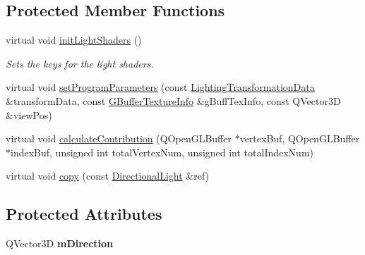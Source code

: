 \subsection*{Protected Member Functions}
\begin{DoxyCompactItemize}
\item 
\mbox{\label{class_geometry_engine_1_1_geometry_world_item_1_1_geometry_light_1_1_directional_light_a0488db9f38fe4382ed9e1b73a4b4eff7}} 
virtual void \mbox{\hyperlink{class_geometry_engine_1_1_geometry_world_item_1_1_geometry_light_1_1_directional_light_a0488db9f38fe4382ed9e1b73a4b4eff7}{init\+Light\+Shaders}} ()
\begin{DoxyCompactList}\small\item\em Sets the keys for the light shaders. \end{DoxyCompactList}\item 
virtual void \mbox{\hyperlink{class_geometry_engine_1_1_geometry_world_item_1_1_geometry_light_1_1_directional_light_ae395d609ee47dd5d399514bb2c76d2db}{set\+Program\+Parameters}} (const \mbox{\hyperlink{class_geometry_engine_1_1_lighting_transformation_data}{Lighting\+Transformation\+Data}} \&transform\+Data, const \mbox{\hyperlink{class_geometry_engine_1_1_g_buffer_texture_info}{G\+Buffer\+Texture\+Info}} \&g\+Buff\+Tex\+Info, const Q\+Vector3D \&view\+Pos)
\item 
virtual void \mbox{\hyperlink{class_geometry_engine_1_1_geometry_world_item_1_1_geometry_light_1_1_directional_light_af1eac6f1aac9388efe95e1a898cf600f}{calculate\+Contribution}} (Q\+Open\+G\+L\+Buffer $\ast$vertex\+Buf, Q\+Open\+G\+L\+Buffer $\ast$index\+Buf, unsigned int total\+Vertex\+Num, unsigned int total\+Index\+Num)
\item 
virtual void \mbox{\hyperlink{class_geometry_engine_1_1_geometry_world_item_1_1_geometry_light_1_1_directional_light_a8d249928526e73e380c049e27c732db9}{copy}} (const \mbox{\hyperlink{class_geometry_engine_1_1_geometry_world_item_1_1_geometry_light_1_1_directional_light}{Directional\+Light}} \&ref)
\end{DoxyCompactItemize}
\subsection*{Protected Attributes}
\begin{DoxyCompactItemize}
\item 
\mbox{\label{class_geometry_engine_1_1_geometry_world_item_1_1_geometry_light_1_1_directional_light_aace75293443cfc30506d1d348fb856c3}} 
Q\+Vector3D {\bfseries m\+Direction}
\end{DoxyCompactItemize}


